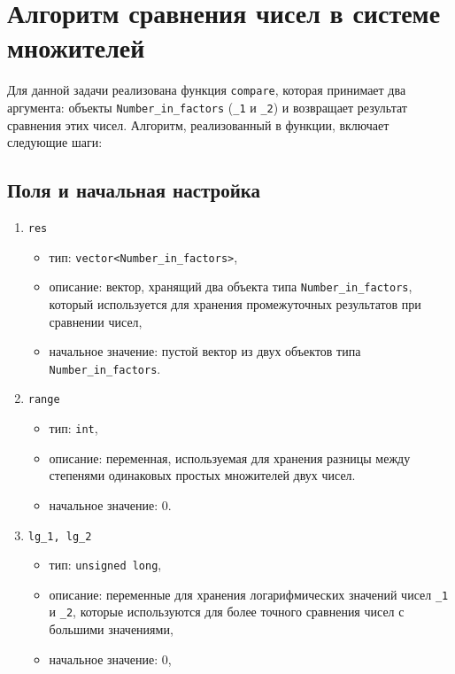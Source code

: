 \section{Алгоритм сравнения чисел в системе множителей}

Для данной задачи реализована функция \texttt{compare}, которая принимает два аргумента: объекты \texttt{Number\_in\_factors} (\texttt{\_1} и \texttt{\_2}) и возвращает результат сравнения этих чисел. Алгоритм, реализованный в функции, включает следующие шаги:

\subsection*{Поля и начальная настройка}
\begin{enumerate}
	\item \texttt{res}
	\begin{itemize}
		\item тип: \texttt{vector<Number\_in\_factors>},
		\item описание: вектор, хранящий два объекта типа \texttt{Number\_in\_factors}, который используется для хранения промежуточных результатов при сравнении чисел,
		\item начальное значение: пустой вектор из двух объектов типа \texttt{Number\_in\_factors}.
	\end{itemize}
	
	\item \texttt{range}
	\begin{itemize}
		\item тип: \texttt{int},
		\item описание: переменная, используемая для хранения разницы между степенями одинаковых простых множителей двух чисел.
		\item начальное значение: 0.
	\end{itemize}
	
	\item \texttt{lg\_1, lg\_2}
	\begin{itemize}
		\item тип: \texttt{unsigned long},
		\item описание: переменные для хранения логарифмических значений чисел \texttt{\_1} и \texttt{\_2}, которые используются для более точного сравнения чисел с большими значениями,
		\item начальное значение: 0,
	\end{itemize}
\end{enumerate}


